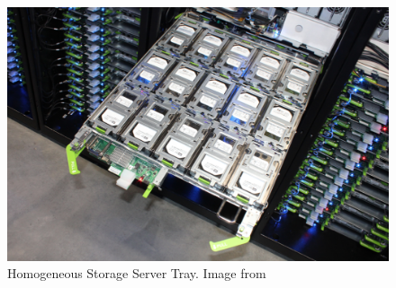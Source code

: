 \begin{figure} [!h]
\centering
\includegraphics[scale=.5]{methodology/images/storage_tray.png}
\caption[Storage Servers]{Homogeneous Storage Server Tray.  Image from \cite{cisco_storage}}
\label{img_storage_tray}
\end{figure}